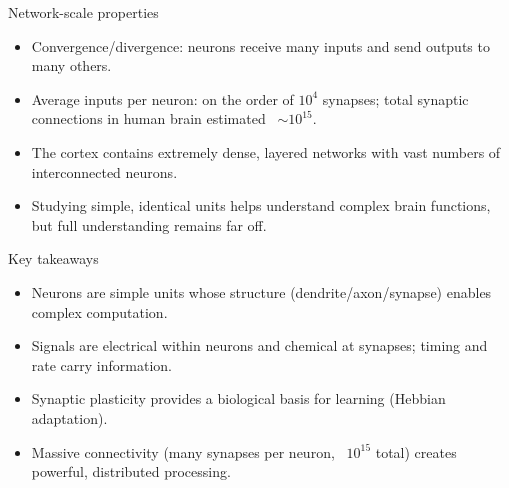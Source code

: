 \documentclass{beamer}
\begin{document}
\begin{frame}{Network-scale properties}
    \begin{itemize}
        \item Convergence/divergence: neurons receive many inputs and send outputs to many others.
        \item Average inputs per neuron: on the order of $10^{4}$ synapses; total synaptic connections in human brain estimated ~$\sim10^{15}$.
        \item The cortex contains extremely dense, layered networks with vast numbers of interconnected neurons.
        \item Studying simple, identical units helps understand complex brain functions, but full understanding remains far off.
    \end{itemize}
\end{frame}

\begin{frame}{Key takeaways}
    \begin{itemize}
        \item Neurons are simple units whose structure (dendrite/axon/synapse) enables complex computation.
        \item Signals are electrical within neurons and chemical at synapses; timing and rate carry information.
        \item Synaptic plasticity provides a biological basis for learning (Hebbian adaptation).
        \item Massive connectivity (many synapses per neuron, ~$10^{15}$ total) creates powerful, distributed processing.
    \end{itemize}
\end{frame}
\end{document}
